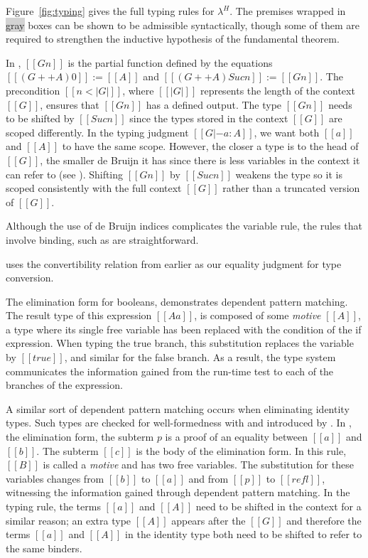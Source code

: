 \documentclass[acmsmall,screen=true,
\ifpublic review=false\else,review=true\fi
  ,anonymous=\ifanonymous true\else false\fi]{acmart}
\newcommand{\lang}{$\lambda^H$\xspace}
\begin{document}
Figure~\ref{fig:typing} gives the full typing rules for \lang{}. The premises
wrapped in \colorbox{lightgray}{gray} boxes can be shown to be admissible
syntactically, though some of them are required to strengthen the inductive
hypothesis of the fundamental theorem.

In , $[[G n]]$ is the partial function defined by the equations
$[[ (G ++ A) 0 ]] := [[A]]$ and $[[ (G ++ A) Suc n ]] := [[G n]]$.  The
precondition $[[n < | G | ]]$, where $[[ | G | ]]$ represents the length of
the context $[[G]]$, ensures that $[[G n]]$ has a defined output. The type
$[[G n]]$ needs to be shifted by $[[Suc n]]$ since the types stored in the
context $[[G]]$ are scoped differently. In the typing judgment
$[[G |- a : A]]$, we want both $[[a]]$ and $[[A]]$ to have the same
scope. However, the closer a type is to the head of $[[G]]$, the smaller de
Bruijn it has since there is less variables in the context it can refer to
(see ). Shifting $[[G n]]$ by $[[Suc n]]$ weakens the type so
it is scoped consistently with the full context $[[G]]$ rather than a
truncated version of $[[G]]$.

Although the use of de Bruijn indices complicates the variable rule, the rules
that involve binding, such as  are straightforward.

 uses the convertibility relation from earlier
as our equality judgment for type conversion. 

The elimination form for booleans,  demonstrates dependent pattern
matching.  The result type of this expression $[[A {a}]]$, is composed of some
\emph{motive} $[[A]]$, a type where its single free variable has been replaced
with the condition of the if expression. When typing the true branch, this
substitution replaces the variable by $[[true]]$, and similar for the false
branch. As a result, the type system communicates the information gained from
the run-time test to each of the branches of the expression.

A similar sort of dependent pattern matching occurs when eliminating identity
types. Such types are checked for well-formedness with  and
introduced by . In , the elimination form, the subterm
$p$ is a proof of an equality between $[[a]]$ and $[[b]]$. The subterm $[[c]]$
is the body of the elimination form. In this rule, $[[B]]$ is called a
\emph{motive} and has two free variables.  The substitution for these
variables changes from $[[b]]$ to $[[a]]$ and from $[[p]]$ to $[[refl]]$,
witnessing the information gained through dependent pattern matching.  In the
typing rule, the terms $[[a]]$ and $[[A]]$ need to be shifted in the context
for a similar reason; an extra type $[[A]]$ appears after the $[[G]]$ and
therefore the terms $[[a]]$ and $[[A]]$ in the identity type both need to be
shifted to refer to the same binders.
\end{document}
